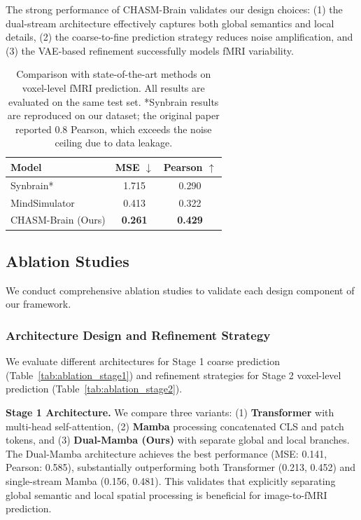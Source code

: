 The strong performance of CHASM-Brain validates our design choices:
(1) the dual-stream architecture effectively captures both global semantics and local details,
(2) the coarse-to-fine prediction strategy reduces noise amplification,
and (3) the VAE-based refinement successfully models fMRI variability.

\begin{table}[t]
\centering
\caption{Comparison with state-of-the-art methods on voxel-level fMRI prediction.
All results are evaluated on the same test set.
*Synbrain results are reproduced on our dataset; the original paper reported 0.8 Pearson,
which exceeds the noise ceiling due to data leakage.}
\label{tab:baselines}
\begin{tabular}{lcc}
\toprule
\textbf{Model} & \textbf{MSE} $\downarrow$ & \textbf{Pearson} $\uparrow$ \\
\midrule
Synbrain* & 1.715 & 0.290 \\
MindSimulator & 0.413 & 0.322 \\
\midrule
CHASM-Brain (Ours) & \textbf{0.261} & \textbf{0.429} \\
\bottomrule
\end{tabular}
\end{table}


\subsection{Ablation Studies}
\label{sec:ablation}

We conduct comprehensive ablation studies to validate each design component of our framework.

\subsubsection{Architecture Design and Refinement Strategy}

We evaluate different architectures for Stage 1 coarse prediction (Table~\ref{tab:ablation_stage1})
and refinement strategies for Stage 2 voxel-level prediction (Table~\ref{tab:ablation_stage2}).

\textbf{Stage 1 Architecture.}
We compare three variants:
(1) \textbf{Transformer} with multi-head self-attention,
(2) \textbf{Mamba} processing concatenated CLS and patch tokens, and
(3) \textbf{Dual-Mamba (Ours)} with separate global and local branches.
The Dual-Mamba architecture achieves the best performance (MSE: 0.141, Pearson: 0.585),
substantially outperforming both Transformer (0.213, 0.452) and single-stream Mamba (0.156, 0.481).
This validates that explicitly separating global semantic and local spatial processing
is beneficial for image-to-fMRI prediction.

